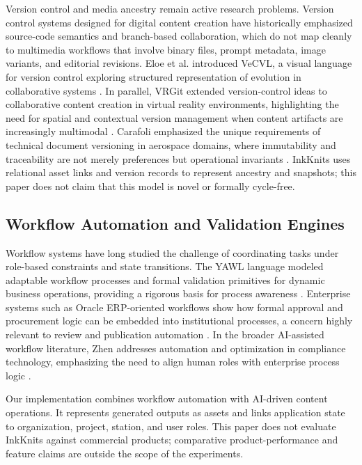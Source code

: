 \documentclass[conference]{IEEEtran}
\begin{document}
Version control and media ancestry remain active research problems. Version control systems designed for digital content creation have historically emphasized source-code semantics and branch-based collaboration, which do not map cleanly to multimedia workflows that involve binary files, prompt metadata, image variants, and editorial revisions. Eloe et al. introduced VeCVL, a visual language for version control exploring structured representation of evolution in collaborative systems \cite{eloe2016}. In parallel, VRGit extended version-control ideas to collaborative content creation in virtual reality environments, highlighting the need for spatial and contextual version management when content artifacts are increasingly multimodal \cite{zhang2023}. Carafoli emphasized the unique requirements of technical document versioning in aerospace domains, where immutability and traceability are not merely preferences but operational invariants \cite{carafoli2025}. InkKnits uses relational asset links and version records to represent ancestry and snapshots; this paper does not claim that this model is novel or formally cycle-free.

\subsection{Workflow Automation and Validation Engines}
Workflow systems have long studied the challenge of coordinating tasks under role-based constraints and state transitions. The YAWL language modeled adaptable workflow processes and formal validation primitives for dynamic business operations, providing a rigorous basis for process awareness \cite{vanderAalst2005}. Enterprise systems such as Oracle ERP-oriented workflows show how formal approval and procurement logic can be embedded into institutional processes, a concern highly relevant to review and publication automation \cite{raghavendra2024}. In the broader AI-assisted workflow literature, Zhen addresses automation and optimization in compliance technology, emphasizing the need to align human roles with enterprise process logic \cite{zhen2020}.

Our implementation combines workflow automation with AI-driven content operations. It represents generated outputs as assets and links application state to organization, project, station, and user roles. This paper does not evaluate InkKnits against commercial products; comparative product-performance and feature claims are outside the scope of the experiments.
\end{document}
